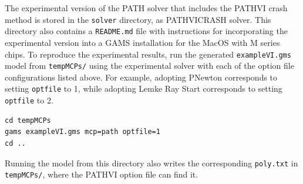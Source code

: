 The experimental version of the PATH solver that includes the PATHVI crash method is stored in the \texttt{solver} directory, as PATHVICRASH solver. This directory also contains a \texttt{README.md} file with instructions for incorporating the experimental version into a GAMS installation for the MacOS with M series chips. To reproduce the experimental results, run the generated \texttt{exampleVI.gms} model from \texttt{tempMCPs/} using the experimental solver with each of the option file configurations listed above. For example, adopting PNewton corresponds to setting \texttt{optfile} to 1, while adopting Lemke Ray Start corresponds to setting \texttt{optfile} to 2.

\begin{verbatim}
cd tempMCPs
gams exampleVI.gms mcp=path optfile=1
cd ..
\end{verbatim}

Running the model from this directory also writes the corresponding \texttt{poly.txt} in \texttt{tempMCPs/}, where the PATHVI option file can find it.

